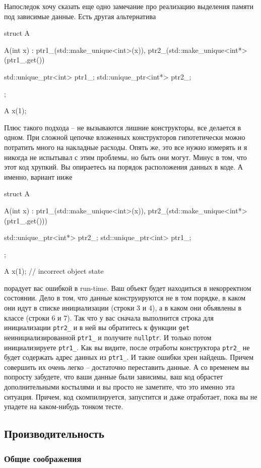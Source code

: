 \documentclass{article}
\begin{document}
Напоследок хочу сказать еще одно замечание про реализацию выделения памяти под зависимые данные. Есть другая альтернатива
\begin{cppcode}
struct A {
  A(int x)
   : ptr1_(std::make_unique<int>(x)),
     ptr2_(std::make_unique<int*>(ptr1_.get()) {}
  
  std::unique_ptr<int> ptr1_;
  std::unique_ptr<int*> ptr2_;
};

A x(1);
\end{cppcode}
Плюс такого подхода -- не вызываются лишние конструкторы, все делается в одном. При сложной цепочке вложенных конструкторов гипотетически можно потратить много на накладные расходы. Опять же, это все нужно измерять и я никогда не испытывал с этим проблемы, но быть они могут. Минус в том, что этот код хрупкий. Вы опираетесь на порядок расположения данных в коде. А именно, вариант ниже
\begin{cppcode}
struct A {
  A(int x)
   : ptr1_(std::make_unique<int>(x)),
     ptr2_(std::make_unique<int*>(ptr1_.get())) {}
  
  std::unique_ptr<int*> ptr2_;
  std::unique_ptr<int> ptr1_;
};

A x(1); // incorrect object state
\end{cppcode}
порадует вас ошибкой в run-time. Ваш объект будет находиться в некорректном состоянии. Дело в том, что данные конструируются не в том порядке, в каком они идут в списке инициализации (строки 3 и 4), а в каком они объявлены в классе (строки 6 и 7). Так что у вас сначала выполнится строка для инициализации \verb"ptr2_" и в ней вы обратитесь к функции \verb"get" неинициализированной \verb"ptr1_" и получите \verb"nullptr". И только потом инициализируете \verb"ptr1_". Как вы видите, после отработы конструктора \verb"ptr2_" не будет содержать адрес данных из \verb"ptr1_". И такие ошибки хрен найдешь. Причем совершить их очень легко -- достаточно переставить данные. А со временем вы попросту забудете, что ваши данные были зависимы, ваш код обрастет дополнительными костылями и вы просто не заметите, что это именно эта ситуация. Причем, код скомпилируется, запустится и даже отработает, пока вы не упадете на каком-нибудь тонком тесте.

\subsection{Производительность}

\subsubsection{Общие соображения}
\end{document}
